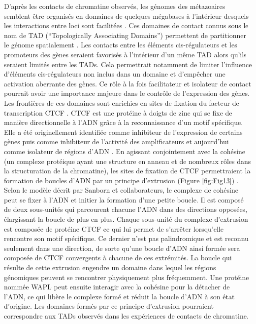 D’après les contacts de chromatine observés, les génomes des métazoaires semblent être organisés en domaines de quelques mégabases à l’intérieur desquels les interactions entre loci sont facilitées \citep{sexton_role_2015, dixon_topological_2012, rao_3d_2014}. Ces domaines de contact connus sous le nom de \acrshort{TAD} (“Topologically Associating Domains”) permettent de partitionner le génome spatialement \citep{symmons_functional_2014}. Les contacts entre les éléments \gls{cis}-régulateurs et les promoteurs des gènes seraient favorisés à l’intérieur d’un même \acrshort{TAD} alors qu’ils seraient limités entre les \acrshort{TAD}s. Cela permettrait notamment de limiter l’influence d’éléments \gls{cis}-régulateurs non inclus dans un domaine et d’empêcher une activation aberrante des gènes. Ce rôle à la fois facilitateur et isolateur de contact pourrait avoir une importance majeure dans le contrôle de l’expression des gènes. \\

Les frontières de ces domaines sont enrichies en sites de fixation du facteur de transcription CTCF \citep{vietrirudan_comparative_2015}. CTCF est une protéine à doigts de zinc qui se fixe de manière directionnelle à l’ADN grâce à la reconnaissance d’un motif spécifique. Elle a été originellement identifiée comme \gls{inhibiteur} de l’expression de certains gènes \citep{filippova_exceptionally_1996} puis comme \gls{inhibiteur} de l’activité des \glspl{amplificateur} et aujourd’hui comme isolateur de régions d'\acrshort{ADN} \citep{bell_protein_1999}. En agissant conjointement avec la cohésine (un complexe protéique ayant une structure en anneau et de nombreux rôles dans la structuration de la chromatine), les sites de fixation de CTCF permettraient la formation de boucles d’ADN par un principe d’extrusion (Figure \ref{fig:Fig13}) \citep{sanborn_chromatin_2015}. Selon le modèle décrit par Sanborn et collaborateurs, le complexe de cohésine peut se fixer à l’ADN et initier la formation d’une petite boucle. Il est composé de deux sous-unités qui parcourent chacune l’ADN dans des directions opposées, élargissant la boucle de plus en plus. Chaque sous-unité du complexe d’extrusion est composée de protéine CTCF ce qui lui permet de s’arrêter lorsqu’elle rencontre son motif spécifique. Ce dernier n’est pas palindromique et est reconnu seulement dans une direction, de sorte qu’une boucle d’ADN ainsi formée sera composée de CTCF convergents à chacune de ces extrémités. La boucle qui résulte de cette extrusion engendre un domaine dans lequel les régions génomiques peuvent se rencontrer physiquement plus fréquemment. Une protéine nommée WAPL peut ensuite interagir avec la cohésine pour la détacher de l’ADN, ce qui libère le complexe formé et réduit la boucle d’ADN à son état d’origine. Les domaines formés par ce principe d’extrusion pourraient correspondre aux \acrshort{TAD}s observés dans les expériences de contacts de chromatine. \\

